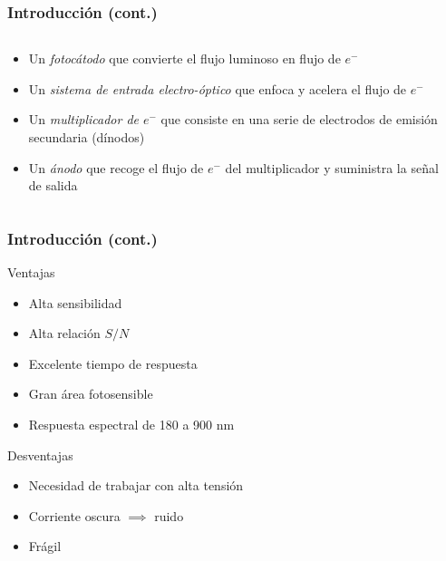 \documentclass{beamer}
\begin{document}
\begin{frame}
\frametitle{Introducci\'on (cont.)}
\begin{columns}
\begin{column}{0.6\textwidth}
\begin{itemize}
\item  Un {\color{blue}\textit{fotoc\'atodo}} que convierte el flujo luminoso en flujo de $e^-$
\item Un {\color{blue}\textit{sistema de entrada electro-\'optico}} que enfoca y acelera el flujo de $e^-$
\item Un {\color{blue}\textit{multiplicador de $e^-$}} que consiste en una serie de electrodos de emisi\'on 
secundaria (d\'inodos)
\item Un {\color{blue}\textit{\'anodo}} que recoge el flujo de $e^-$ del multiplicador y suministra la señal 
de salida
\end{itemize}
\end{column}
\begin{column}{0.4\textwidth}
\end{column}
\end{columns}
\end{frame} 

\begin{frame}
\frametitle{Introducci\'on (cont.)}
\begin{exampleblock}{Ventajas}
\begin{itemize}
\item Alta sensibilidad
\item Alta relaci\'on $S/N$
\item Excelente tiempo de respuesta
\item Gran \'area fotosensible
\item Respuesta espectral de 180 a 900 nm
\end{itemize}
\end{exampleblock}\pause
\begin{alertblock}{Desventajas}
\begin{itemize}
\item Necesidad de trabajar con alta tensi\'on
\item Corriente oscura $\implies$ ruido
\item Fr\'agil
\end{itemize}
\end{alertblock}
\end{frame} 
\end{document}
